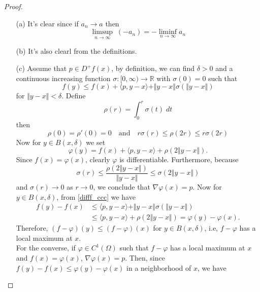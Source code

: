 \documentclass[12pt, oneside]{amsart}  	%
\begin{document}
\begin{proof}\quad
\begin{itemize}
\item[(a)] It's clear since if $a_n \longrightarrow a$ then
\begin{equation*}
\limsup_{n\longrightarrow \infty}\;(-a_n) = -\liminf_{n\longrightarrow \infty} a_n
\end{equation*}
\item[(b)] It's also clearl from the definitions.
\item[(c)] Assume that $p\in D^+f(x)$, by definition, we can find $\delta > 0$ and a continuous increasing function $\sigma:[0,\infty)\longrightarrow \mathbb{R}$ with $\sigma(0) = 0$ such that
\begin{equation}\label{difff_ccc}
f(y) \leq f(x) + \langle p,y-x\rangle + \Vert y-x\Vert \sigma(\Vert y-x\Vert)
\end{equation}
for $\Vert y-x\Vert < \delta$. Define
\begin{equation*}
\rho(r) = \int_{0}^r \sigma(t)\;dt 
\end{equation*}
then
\begin{equation*}
 \rho(0) = \rho'(0) = 0 \quad\text{and}\quad r\sigma(r)\leq \rho(2r)\leq r\sigma(2r)
\end{equation*}
Now for $y\in B(x,\delta)$ we set
\begin{equation*}
\varphi(y) = f(x) + \langle p,y-x\rangle + \rho(2\Vert y-x\Vert).
\end{equation*}
Since $f(x) = \varphi(x)$, clearly $\varphi$ is differentiable. Furthermore, because 
\begin{equation*}
\sigma(r)\leq\frac{\rho(2\Vert y-x\Vert)}{\Vert y-x\Vert}  \leq \sigma(2\Vert y-x\Vert)
\end{equation*}
and $\sigma(r)\longrightarrow 0$ as $r\longrightarrow 0$, we conclude that $\nabla \varphi(x) = p$. Now for $y\in B(x,\delta)$, from \eqref{difff_ccc} we have
\begin{align*}
f(y) - f(x) &\leq \langle p,y-x\rangle + \Vert y-x\Vert\sigma(\Vert y-x\Vert)\\
 &\leq \langle p,y-x\rangle + \rho(2\Vert y-x\Vert) = \varphi(y) - \varphi(x).
\end{align*}
Therefore, $(f-\varphi)(y) \leq (f-\varphi)(x)$ for $y\in B(x,\delta)$, i.e, $f-\varphi$ has a local maximum at $x$.\\
For the converse, if $\varphi\in C^1(\Omega)$ such that $f-\varphi$ has a local maximum at $x$ and $f(x) = \varphi(x)$, $\nabla \varphi(x) = p$. Then, since $f(y) -f(x) \leq \varphi(y) - \varphi(x)$ in a neighborhood of $x$, we have

\end{itemize}
\end{proof}
\end{document}
